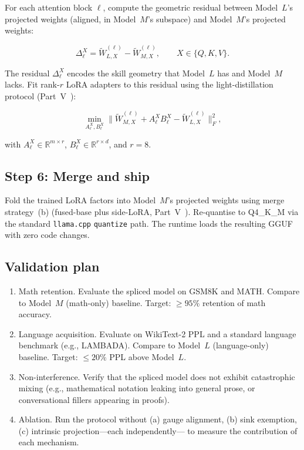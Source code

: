 \documentclass[11pt]{article}
\begin{document}
For each attention block $\ell$, compute the geometric residual
between Model~$L$'s projected weights (aligned, in Model~$M$'s
subspace) and Model~$M$'s projected weights:

\begin{equation}
\Delta_\ell^X = \tilde W_{L,X}^{(\ell)} - \tilde W_{M,X}^{(\ell)},
\qquad X \in \{Q,K,V\}.
\label{eq:residual}
\end{equation}

The residual $\Delta_\ell^X$ encodes the skill geometry that Model~$L$
has and Model~$M$ lacks.  Fit rank-$r$ LoRA adapters to this residual
using the light-distillation protocol (Part~V~\cite{stewart2026distill}):

\begin{equation}
\min_{A_\ell^X, B_\ell^X} \|\tilde W_{M,X}^{(\ell)} + A_\ell^X B_\ell^X -
\tilde W_{L,X}^{(\ell)}\|_F^2,
\label{eq:lora-fit}
\end{equation}

with $A_\ell^X \in \mathbb{R}^{m \times r}$, $B_\ell^X \in
\mathbb{R}^{r \times d}$, and $r=8$.

\subsection{Step 6: Merge and ship}

Fold the trained LoRA factors into Model~$M$'s projected weights using
merge strategy~(b) (fused-base plus side-LoRA, Part~V~\cite{stewart2026distill}).
Re-quantise to Q4\_K\_M via the standard \texttt{llama.cpp}
\texttt{quantize} path.  The runtime loads the resulting GGUF with zero
code changes.

\subsection{Validation plan}

\begin{enumerate}
\item Math retention.  Evaluate the spliced model on GSM8K
      and MATH.  Compare to Model~$M$ (math-only) baseline.  Target:
      ${\ge}95\%$ retention of math accuracy.

\item Language acquisition.  Evaluate on WikiText-2 PPL and
      a standard language benchmark (e.g., LAMBADA).  Compare to
      Model~$L$ (language-only) baseline.  Target: ${\le}20\%$ PPL
      above Model~$L$.

\item Non-interference.  Verify that the spliced model does
      not exhibit catastrophic mixing (e.g., mathematical notation
      leaking into general prose, or conversational fillers appearing
      in proofs).

\item Ablation.  Run the protocol without (a) gauge alignment,
      (b) sink exemption, (c) intrinsic projection---each independently---
      to measure the contribution of each mechanism.
\end{enumerate}
\end{document}
